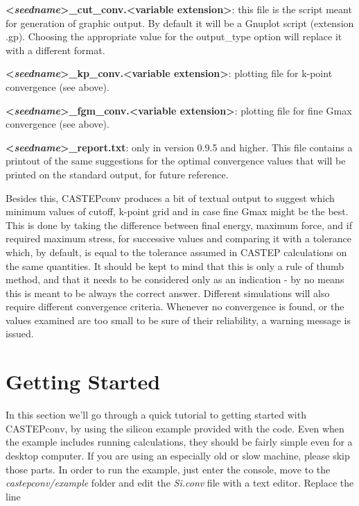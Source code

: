 \documentclass[10pt]{article}
\begin{document}
\textbf{\textless \textit{seedname}\textgreater\_cut\_conv.\textless variable extension\textgreater}: this file is the script meant for generation of graphic 
output. By default it will be a Gnuplot script (extension .gp). Choosing the
appropriate value for the output\_type option will replace it with a different format.

\textbf{\textless \textit{seedname}\textgreater\_kp\_conv.\textless variable extension\textgreater}: plotting file for k-point convergence (see above).

\textbf{\textless \textit{seedname}\textgreater\_fgm\_conv.\textless variable extension\textgreater}: plotting file for fine Gmax convergence (see above).

\textbf{\textless \textit{seedname}\textgreater\_report.txt}: only in version
0.9.5 and higher. This file contains a printout of the same suggestions for
the optimal convergence values that will be printed on the standard output,
for future reference.

Besides this, CASTEPconv produces a bit of textual output to suggest which 
minimum values of cutoff, k-point grid and in case fine Gmax might be the best. This is done by 
taking the difference between final energy, maximum force, and if required 
maximum stress, for successive values and comparing it with a tolerance which, 
by default, is equal to the tolerance assumed in CASTEP calculations on the same 
quantities. It should be kept to mind that this is only a rule of thumb method, 
and that it needs to be considered only as an indication - by no means this is 
meant to be always the correct answer. Different simulations will also require 
different convergence criteria. Whenever no convergence is found, or the values 
examined are too small to be sure of their reliability, a warning message is 
issued.

\section{Getting Started}

In this section we'll go through a quick tutorial to getting started with CASTEPconv, by using the silicon example provided with the code. Even when the example includes running calculations, they should be fairly simple even for a desktop computer. If you are using an especially old or slow machine, please skip those parts.\newline
In order to run the example, just enter the console, move to the \textit{castepconv/example} folder and edit the \textit{Si.conv} file with a text editor. Replace the line
\end{document}
